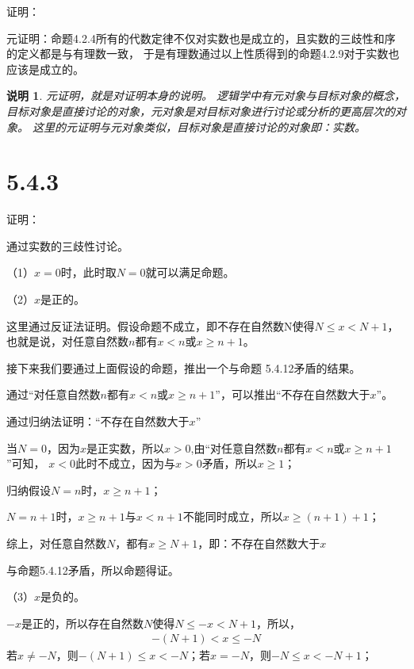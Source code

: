 \documentclass{article}
\theoremstyle{mystyle}
\newtheorem*{zremark}{说明}
\begin{document}
证明：

元证明：命题4.2.4所有的代数定律不仅对实数也是成立的，且实数的三歧性和序的定义都是与有理数一致，
于是有理数通过以上性质得到的命题4.2.9对于实数也应该是成立的。

\begin{zgraytheorem}
  \begin{zremark}
    元证明，就是对证明本身的说明。
    逻辑学中有元对象与目标对象的概念，目标对象是直接讨论的对象，元对象是对目标对象进行讨论或分析的更高层次的对象。
    这里的元证明与元对象类似，目标对象是直接讨论的对象即：实数。
  \end{zremark}
\end{zgraytheorem}

\section*{5.4.3}

证明：

通过实数的三歧性讨论。

（1）$x=0$时，此时取$N=0$就可以满足命题。

（2）$x$是正的。

这里通过反证法证明。假设命题不成立，即不存在自然数N使得$N \leq x < N + 1$，
也就是说，对任意自然数$n$都有$x < n$或$x \geq n + 1$。

接下来我们要通过上面假设的命题，推出一个与命题 5.4.12矛盾的结果。

通过“对任意自然数$n$都有$x < n$或$x \geq n + 1$”，可以推出“不存在自然数大于$x$”。

通过归纳法证明：“不存在自然数大于$x$”

当$N=0$，因为$x$是正实数，所以$x > 0$,由“对任意自然数$n$都有$x < n$或$x \geq n + 1$”可知，
$x < 0$此时不成立，因为与$x > 0$矛盾，所以$x \geq 1$；

归纳假设$N=n$时，$x \geq n + 1$；

$N=n+1$时，$x \geq n + 1$与$x < n + 1$不能同时成立，所以$x \geq (n+1) + 1$；

综上，对任意自然数$N$，都有$x \geq N + 1$，即：不存在自然数大于$x$

与命题5.4.12矛盾，所以命题得证。

（3）$x$是负的。

$-x$是正的，所以存在自然数$N$使得$N \leq -x < N + 1$，所以，
\begin{align*}
  -(N + 1) < x \leq -N
\end{align*}
若$x \neq -N$，则$-(N + 1) \leq x < -N$；若$x = -N$，则$-N \leq x < -N + 1$；
\end{document}
